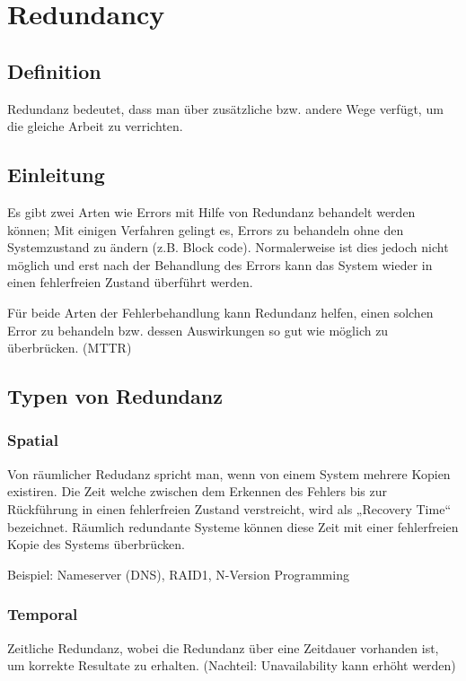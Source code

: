 \section{Redundancy}


\subsection{Definition}


Redundanz bedeutet, dass man über zusätzliche bzw. andere Wege verfügt, um die gleiche Arbeit zu verrichten.

\subsection{Einleitung}

Es gibt zwei Arten wie Errors mit Hilfe von Redundanz behandelt werden können; Mit einigen Verfahren gelingt es, Errors zu behandeln ohne den Systemzustand zu ändern (z.B. Block code). Normalerweise ist dies jedoch nicht möglich und erst nach der Behandlung des Errors kann das System wieder in einen fehlerfreien Zustand überführt werden.

Für beide Arten der Fehlerbehandlung kann Redundanz helfen, einen solchen Error zu behandeln bzw. dessen Auswirkungen so gut wie möglich zu überbrücken. (MTTR)

\subsection{Typen von Redundanz}

\subsubsection*{Spatial}

Von räumlicher Redudanz spricht man, wenn von einem System mehrere Kopien existiren. Die Zeit welche zwischen dem Erkennen des Fehlers bis zur Rückführung in einen fehlerfreien Zustand verstreicht, wird als „Recovery Time“  bezeichnet. Räumlich redundante Systeme können diese Zeit mit einer fehlerfreien Kopie des Systems überbrücken.

Beispiel: Nameserver (DNS), RAID1, N-Version Programming

\subsubsection*{Temporal}

Zeitliche Redundanz, wobei die Redundanz über eine Zeitdauer vorhanden ist, um korrekte Resultate zu erhalten. (Nachteil: Unavailability kann erhöht werden)

